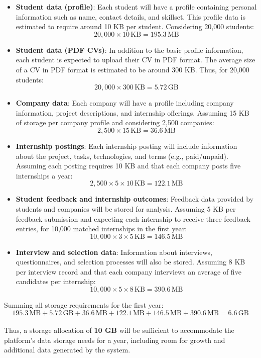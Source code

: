 \begin{itemize}
    \item \textbf{Student data (profile)}: Each student will have a profile containing personal information such as name, contact details, and skillset. This profile data is estimated to require around 10 KB per student. Considering 20,000 students:
    \[
        20,000 \times 10 \, \text{KB} = 195.3 \, \text{MB}
    \]

    \item \textbf{Student data (PDF CVs)}: In addition to the basic profile information, each student is expected to upload their CV in PDF format. The average size of a CV in PDF format is estimated to be around 300 KB. Thus, for 20,000 students:
    \[
        20,000 \times 300 \, \text{KB} = 5.72 \, \text{GB}
    \]

    \item \textbf{Company data}: Each company will have a profile including company information, project descriptions, and internship offerings. Assuming 15 KB of storage per company profile and considering 2,500 companies:
    \[
        2,500 \times 15 \, \text{KB} = 36.6 \, \text{MB}
    \]

    \item \textbf{Internship postings}: Each internship posting will include information about the project, tasks, technologies, and terms (e.g., paid/unpaid). Assuming each posting requires 10 KB and that each company posts five internships a year:
    \[
        2,500 \times 5 \times 10 \, \text{KB} = 122.1 \, \text{MB}
    \]

    \item \textbf{Student feedback and internship outcomes}: Feedback data provided by students and companies will be stored for analysis. Assuming 5 KB per feedback submission and expecting each internship to receive three feedback entries, for 10,000 matched internships in the first year:
    \[
        10,000 \times 3 \times 5 \, \text{KB} = 146.5 \, \text{MB}
    \]

    \item \textbf{Interview and selection data}: Information about interviews, questionnaires, and selection processes will also be stored. Assuming 8 KB per interview record and that each company interviews an average of five candidates per internship:
    \[
        10,000 \times 5 \times 8 \, \text{KB} = 390.6 \, \text{MB}
    \]
\end{itemize}

Summing all storage requirements for the first year:
\[
    195.3 \, \text{MB} + 5.72 \, \text{GB} + 36.6 \, \text{MB} + 122.1 \, \text{MB} + 146.5 \, \text{MB} + 390.6 \, \text{MB} = 6.6 \, \text{GB}
\]\\
Thus, a storage allocation of \textbf{10 GB} will be sufficient to accommodate the platform's data storage needs for a year, including room for growth and additional data generated by the system.


